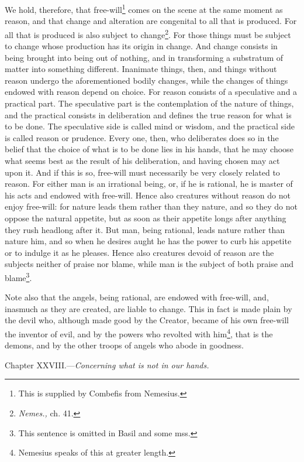 We hold, therefore, that free-will\footnote{This is supplied by Combefis from Nemesius.} comes on the scene at the same moment as reason, and that change and alteration are congenital to all that is produced. For all that is produced is also subject to change\footnote{\emph{Nemes.,} ch. 41.}. For those things must be subject to change whose production has its origin in change. And change consists in being brought into being out of nothing, and in transforming a substratum of matter into something different. Inanimate things, then, and things without reason undergo the aforementioned bodily changes, while the changes of things endowed with reason depend on choice. For reason consists of a speculative and a practical part. The speculative part is the contemplation of the nature of things, and the practical consists in deliberation and defines the true reason for what is to be done. The speculative side is called mind or wisdom, and the practical side is called reason or prudence. Every one, then, who deliberates does so in the belief that the choice of what is to be done lies in his hands, that he may choose what seems best as the result of his deliberation, and having chosen may act upon it. And if this is so, free-will must necessarily be very closely related to reason. For either man is an irrational being, or, if he is rational, he is master of his acts and endowed with free-will. Hence also creatures without reason do not enjoy free-will: for nature leads them rather than they nature, and so they do not oppose the natural appetite, but as soon as their appetite longs after anything they rush headlong after it. But man, being rational, leads nature rather than nature him, and so when he desires aught he has the power to curb his appetite or to indulge it as he pleases. Hence also creatures devoid of reason are the subjects neither of praise nor blame, while man is the subject of both praise and blame\footnote{This sentence is omitted in Basil and some mss.}.

Note also that the angels, being rational, are endowed with free-will, and, inasmuch as they are created, are liable to change. This in fact is made plain by the devil who, although made good by the Creator, became of his own free-will the inventor of evil, and by the powers who revolted with him\footnote{Nemesius speaks of this at greater length.}, that is the demons, and by the other troops of angels who abode in goodness.


Chapter XXVIII.—\emph{Concerning what is not in our hands.}

